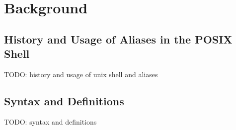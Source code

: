 \section{Background}

\subsection{History and Usage of Aliases in the POSIX Shell}

TODO: history and usage of unix shell and aliases

\subsection{Syntax and Definitions}
TODO: syntax and definitions
